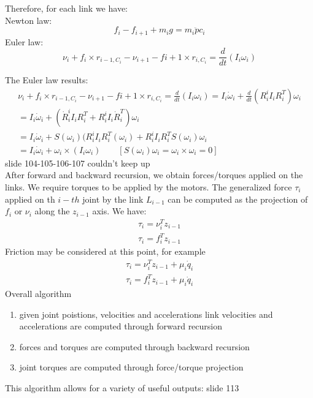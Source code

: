 \documentclass{book}
\begin{document}
Therefore, for each link we have:\\
Newton law:
\[
    f_i-f_{i+1}+m_ig=m_i\ddot{p}c_i
\]
Euler law:
\[
    \nu_i + f_i\times r_{i-1,C_i}-\nu_{i+1}-f{i+1}\times r_{i,C_i}=\frac{d}{dt}(I_i\omega_i)
\]

The Euler law results:
\begin{gather*}
    \nu_i + f_i\times r_{i-1,C_i}-\nu_{i+1}-f{i+1}\times r_{i,C_i}=\frac{d}{dt}(I_i\omega_i)=I_i\dot{\omega}_i+\frac{d}{dt}(R_i ^iI_iR_i^T)\omega_i\\
    = I_i\dot{\omega}_i + (\dot{R}_i ^iI_iR_i^T + R_i ^iI_i\dot{R}_i^T)\omega_i\\
    =I_i\dot{\omega}_i+S(\omega_i)(R_i ^iI_iR_i^T(\omega_i)+R_i ^iI_iR_i^TS(\omega_i)\omega_i\\
    = I_i\dot{\omega}_i+\omega_i\times(I_i\omega_i) \qquad [S(\omega_i)\omega_i = \omega_i\times \omega_i=0]
\end{gather*}
slide 104-105-106-107 couldn't keep up\\
After forward and backward recursion, we obtain forces/torques applied on the links. We require torques to be applied by the motors. The generalized force $\tau_i$ applied on th $i-th$ joint by the link $L_{i-1}$ can be computed as the projection of $f_i$ or $\nu_i$ along the $z_{i-1}$ axis. We have:
\begin{gather*}
    \tau_i = \nu_i^Tz_{i-1}\\
    \tau_i = f_i^Tz_{i-1}
\end{gather*}
Friction may be considered at this point, for example
\begin{gather*}
    \tau_i = \nu_i^Tz_{i-1}+\mu_i\dot{q}_i\\
    \tau_i = f_i^Tz_{i-1}+\mu_i\dot{q}_i
\end{gather*}
Overall algorithm
\begin{enumerate}
    \item given joint poistions, velocities and accelerations link velocities and accelerations are computed through forward recursion
    \item forces and torques are computed through backward recursion
    \item joint torques are computed through force/torque projection
\end{enumerate}
This algorithm allows for a variety of useful outputs: slide 113
\end{document}
